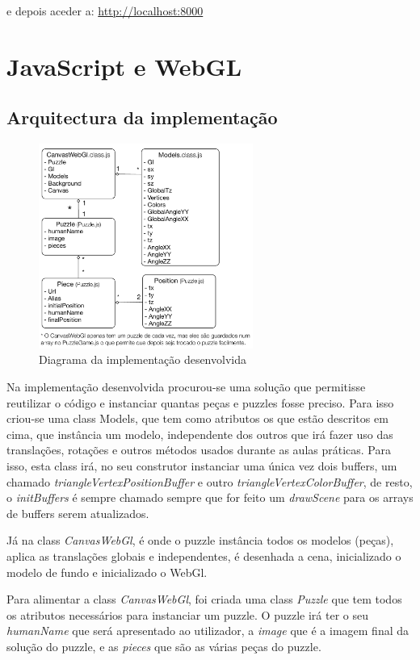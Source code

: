 \documentclass[pdftex,12pt,a4paper]{report}
\begin{document}
e depois aceder a: \url{http://localhost:8000}

\section{JavaScript e WebGL}

\subsection{Arquitectura da implementação}

\begin{figure}[!htb]
\center
 \includegraphics[width=70mm,scale=1]{classes.pdf}
 \caption{Diagrama da implementação desenvolvida}
 \label{fig:decifra_livro}
\end{figure}

Na implementação desenvolvida procurou-se uma solução que permitisse reutilizar o código e instanciar quantas peças e puzzles fosse preciso. Para isso criou-se uma class Models, que tem como atributos os que estão descritos em cima, que instância um modelo, independente dos outros que irá fazer uso das translações, rotações e outros métodos usados durante as aulas práticas. Para isso, esta class irá, no seu construtor instanciar uma única vez dois buffers, um chamado \textit{triangleVertexPositionBuffer} e outro  \textit{triangleVertexColorBuffer}, de resto, o \textit{initBuffers} é sempre chamado sempre que for feito um \textit{drawScene} para os arrays de buffers serem atualizados.

Já na class \textit{CanvasWebGl}, é onde o puzzle instância todos os modelos (peças), aplica as translações globais e independentes, é desenhada a cena, inicializado o modelo de fundo e inicializado o WebGl. 

Para alimentar a class \textit{CanvasWebGl}, foi criada uma class \textit{Puzzle} que tem todos os atributos necessários para instanciar um puzzle. O puzzle irá ter o seu \textit{humanName} que será apresentado ao utilizador, a \textit{image} que é a imagem final da solução do puzzle, e as \textit{pieces} que são as várias peças do puzzle.
\end{document}
